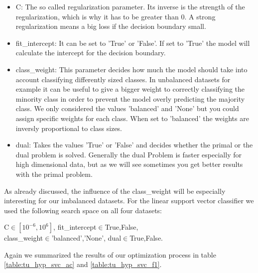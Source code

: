\documentclass[a4paper,10pt]{article}
\begin{document}
\begin{itemize}
    \item \textsf{C}: The so called regularization parameter. Its inverse is the strength of the regularization, which is why it has to be greater than 0. A strong regularization means a big loss if the decision boundary small.
\item \textsf{fit\_intercept}: It can be set to 'True' or 'False'. If set to 'True' the model will calculate the intercept for the decision boundary.
\item\textsf{class\_weight}: This parameter decides how much the model should take into account classifying differently sized classes. In unbalanced datasets for example it can be useful to give a bigger weight to correctly classifying the minority class in order to prevent the model overly predicting the majority class. We only considered the values 'balanced' and 'None' but you could assign specific weights for each class. When set to 'balanced' the weights are inversly proportional to class sizes.
\item \textsf{dual}: Takes the values 'True' or 'False' and decides whether the primal or the dual problem is solved. Generally the dual Problem is faster especially for high dimensional data, but as we will see sometimes you get better results with the primal problem.
\end{itemize}

As already discussed, the influence of the \textsf{class\_weight} will be especially interesting for our imbalanced datasets. For the linear support vector classifier we used the following search space on all four datasets:

\begin{center}
    \parbox{0.55\textwidth}{%
    \raggedright
    \textsf{C}\(\in[10^{-6},10^{6}]\), \textsf{fit\_intercept}\(\in\){True,False},\\ \textsf{class\_weight}\(\in\){'balanced','None'}, \textsf{dual}\(\in\){True,False}.	
    }
\end{center}

Again we summarized the results of our optimization process in table \ref{table:tu_hyp_svc_ac} and \ref{table:tu_hyp_svc_f1}.
\end{document}
